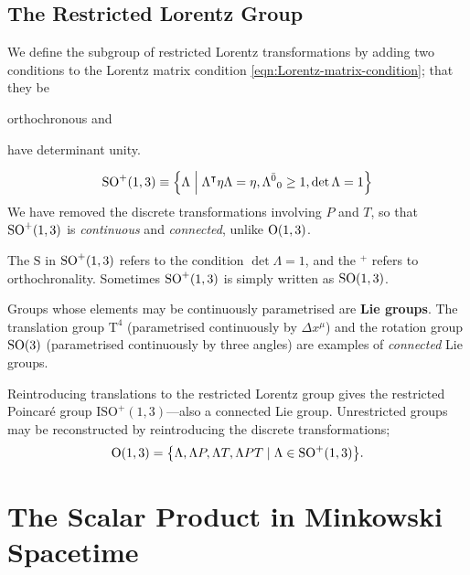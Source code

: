 \subsection{The Restricted Lorentz Group}

We define the subgroup of restricted Lorentz transformations by adding two conditions to the Lorentz matrix condition \eqref{eqn:Lorentz-matrix-condition}; that they be
\begin{enumerate*}[label=\arabic*)]
	\item orthochronous and
	\item have determinant unity.
\end{enumerate*}
\begin{align}
	\mathrm{SO}^+(1,3) \equiv \qty{\Lambda \;\middle|\; \Lambda^\intercal\eta\Lambda = \eta,
	\Lambda^{\bar0}{}_0 \ge 1, \det\Lambda = 1}
	\label{eqn:def-restricted-Lorentz-group}
\end{align}
We have removed the discrete transformations involving $ P$ and $ T$, so that $\mathrm{SO}^+(1,3)$ is \emph{continuous} and \emph{connected}, unlike $\mathrm{O}(1,3)$.

\begin{note}[Notation]
	The $\mathrm{S}$ in $\mathrm{SO}^+(1,3)$ refers to the condition $\det\Lambda = 1$, and the $^+$ refers to orthochronality.
	Sometimes $\mathrm{SO}^+(1,3)$ is simply written as $\mathrm{SO}(1,3)$.
\end{note}

Groups whose elements may be continuously parametrised are \textbf{Lie groups}.
The translation group $\mathrm{T}^4$ (parametrised continuously by $\Delta x^\mu$) and the rotation group $\mathrm{SO}(3)$ (parametrised continuously by three angles) are examples of \emph{connected} Lie groups.

Reintroducing translations to the restricted Lorentz group gives the restricted Poincaré group $\mathrm{ISO}^+(1,3)$---also a connected Lie group.
Unrestricted groups may be reconstructed by reintroducing the discrete transformations;
\begin{align}
	\mathrm{O}(1,3) = \qty{\Lambda, \Lambda P, \Lambda T, \Lambda PT \mid \Lambda \in \mathrm{SO}^+(1,3)}
.\end{align}






\section{The Scalar Product in Minkowski Spacetime}






